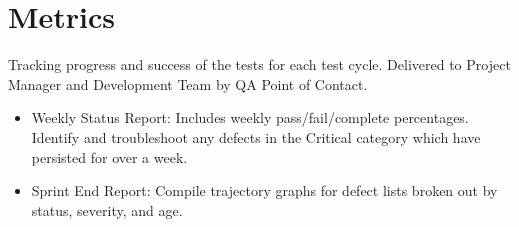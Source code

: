 \documentclass[letterpaper,10pt,english,openany,oneside]{sphinxmanual}
\begin{document}
\section{Metrics}
\label{\detokenize{test_plan/issue_management:metrics}}
Tracking progress and success of the tests for each test cycle. Delivered to Project Manager and Development Team by QA Point of Contact.
\begin{itemize}
\item {} 
Weekly Status Report: Includes weekly pass/fail/complete percentages. Identify and troubleshoot any defects in the Critical category which have persisted for over a week.

\item {} 
Sprint End Report: Compile trajectory graphs for defect lists broken out by status, severity, and age.

\end{itemize}
\end{document}
